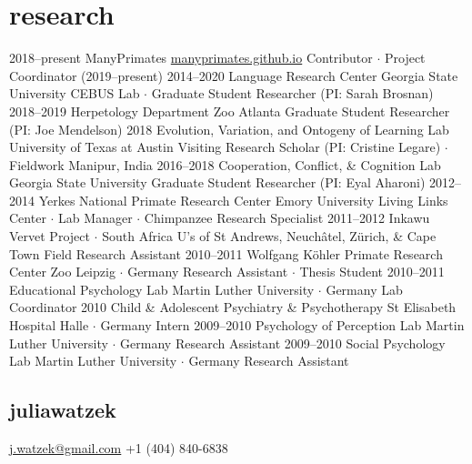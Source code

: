 \documentclass[]{friggeri-cv}
\begin{document}

\section{research}

\begin{entrylist}
  \entry
    {2018--present}
    {ManyPrimates}
    {\href{https://manyprimates.github.io}{manyprimates.github.io}}
    {Contributor $\cdot$ Project Coordinator (2019--present)}
  \entry
    {2014--2020}
    {Language Research Center}
    {Georgia State University}
    {CEBUS Lab $\cdot$ Graduate Student Researcher (PI: Sarah Brosnan)}
  \entry
    {2018--2019}
    {Herpetology Department}
    {Zoo Atlanta}
    {Graduate Student Researcher (PI: Joe Mendelson)}
  \entry
    {2018}
    {Evolution, Variation, and Ontogeny of Learning Lab}
    {University of Texas at Austin}
    {Visiting Research Scholar (PI: Cristine Legare) $\cdot$ Fieldwork Manipur, India}
  \entry
    {2016--2018}
    {Cooperation, Conflict, \& Cognition Lab}
    {Georgia State University}
    {Graduate Student Researcher (PI: Eyal Aharoni)}
  \entry
    {2012--2014}
    {Yerkes National Primate Research Center}
    {Emory University}
    {Living Links Center $\cdot$ Lab Manager $\cdot$ Chimpanzee Research Specialist}
  \entry
    {2011--2012}
    {Inkawu Vervet Project $\cdot$ South Africa}
    {U's of St Andrews, Neuch\^{a}tel, Z\"urich, \& Cape Town}
    {Field Research Assistant}
  \entry
    {2010--2011}
    {Wolfgang K\"{o}hler Primate Research Center}
    {Zoo Leipzig $\cdot$ Germany}
    {Research Assistant $\cdot$ Thesis Student}
  \entry
    {2010--2011}
    {Educational Psychology Lab}
    {Martin Luther University $\cdot$ Germany}
    {Lab Coordinator}
  \entry
    {2010}
    {Child \& Adolescent Psychiatry \& Psychotherapy}
    {St Elisabeth Hospital Halle $\cdot$ Germany}
    {Intern}
  \entry
    {2009--2010}
    {Psychology of Perception Lab}
    {Martin Luther University $\cdot$ Germany}
    {Research Assistant}
  \entry
    {2009--2010}
    {Social Psychology Lab}
    {Martin Luther University $\cdot$ Germany}
    {Research Assistant}
\end{entrylist}




\begin{aside}
  \section{{\normalfont julia}watzek}
    \href{mailto:j.watzek@gmail.com}{j.watzek@gmail.com}
    +1 (404) 840-6838
\end{aside}
\end{document}
